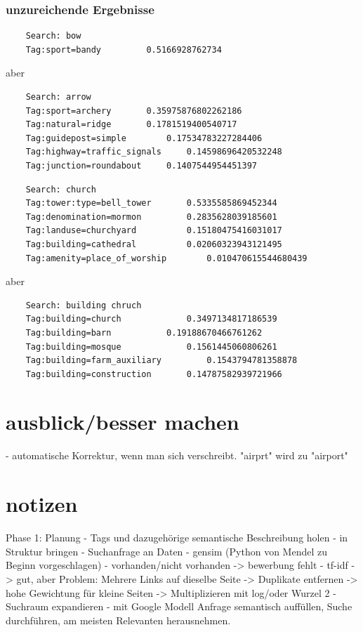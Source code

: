 \documentclass[12pt,pdftex,a4paper]{article}
\begin{document}
\subsubsection{unzureichende Ergebnisse}
\begin{lstlisting}
	Search: bow
	Tag:sport=bandy 	 	0.5166928762734
\end{lstlisting}
aber
\begin{lstlisting}
	Search: arrow
	Tag:sport=archery 	 	0.35975876802262186
	Tag:natural=ridge 	 	0.1781519400540717
	Tag:guidepost=simple 	 	0.17534783227284406
	Tag:highway=traffic_signals 	0.14598696420532248
	Tag:junction=roundabout 	0.1407544954451397
\end{lstlisting}
\begin{lstlisting}
	Search: church
	Tag:tower:type=bell_tower 	 	0.5335585869452344
	Tag:denomination=mormon 	 	0.2835628039185601
	Tag:landuse=churchyard 	 		0.15180475416031017
	Tag:building=cathedral 	 		0.02060323943121495
	Tag:amenity=place_of_worship		0.010470615544680439
\end{lstlisting}
aber
\begin{lstlisting}
	Search: building chruch
	Tag:building=church 	 		0.3497134817186539
	Tag:building=barn 	 		0.19188670466761262
	Tag:building=mosque 	 		0.1561445060806261
	Tag:building=farm_auxiliary 		0.1543794781358878
	Tag:building=construction 	 	0.14787582939721966
\end{lstlisting}

\section{ausblick/besser machen}
- automatische Korrektur, wenn man sich verschreibt. "airprt" wird zu "airport"


\section{notizen}
Phase 1: Planung
- Tags und dazugehörige semantische Beschreibung holen
- in Struktur bringen
- Suchanfrage an Daten 
- gensim (Python von Mendel zu Beginn vorgeschlagen)
- vorhanden/nicht vorhanden 
-> bewerbung fehlt
- tf-idf
-> gut, aber Problem: Mehrere Links auf dieselbe Seite
-> Duplikate entfernen
-> hohe Gewichtung für kleine Seiten
-> Multiplizieren mit log/oder Wurzel 2
- Suchraum expandieren
- mit Google Modell Anfrage semantisch auffüllen, Suche durchführen, am meisten Relevanten herausnehmen.
\end{document}

